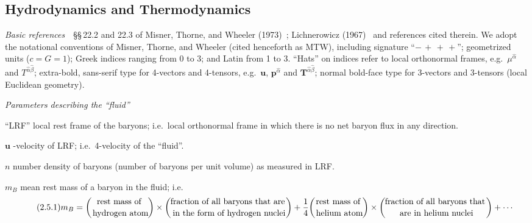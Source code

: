 

\subsection{Hydrodynamics and Thermodynamics}
\label{sec:2.5}

\emph{Basic references}~~\S\S\,22.2 and 22.3 of Misner, Thorne, and Wheeler
(1973)~\cite{MTW1973}; Lichnerowicz (1967)~\cite{Lichnerowicz1967} and
references cited therein.  We adopt the notational conventions of
Misner, Thorne, and Wheeler (cited henceforth as MTW), including
signature ``$-\,+\,+\,+$''; geometrized units ($c = G = 1$); Greek
indices ranging from 0 to 3; and Latin from 1 to 3.  ``Hats'' on indices
refer to local orthonormal frames, e.g.\ $\mu^{\hat{\alpha}}$ and
$T^{\hat{\alpha}\hat{\beta}}$; extra-bold, sans-serif type for 4-vectors
and 4-tensors, e.g.\ $\mathbf{u}$, $\mathbf{p}^{\hat{\alpha}}$ and
$\mathbf{T}^{\hat{\alpha}\hat{\beta}}$; normal bold-face type for
3-vectors and 3-tensors (local Euclidean geometry).

\bigskip
\noindent
\emph{Parameters describing the ``fluid''}

\smallskip
\noindent
``LRF'' \quad local rest frame of the baryons; i.e.\ local orthonormal
frame in which there is no net baryon flux in any direction.

\smallskip
\noindent
$\mathbf{u}$ -velocity of LRF; i.e.\ 4-velocity of the ``fluid''.

\smallskip
\noindent
$n$ \quad number density of baryons (number of baryons per unit volume)
as measured in LRF.

\smallskip
\noindent
$m_B$ \quad mean rest mass of a baryon in the fluid; i.e.
%
\begin{equation}
\tag{2.5.1}
m_B
= \left(\!\text{rest mass of}\atop\text{hydrogen atom}\!\right)
  \times \left(\!\text{fraction of all baryons that are}\atop
              \text{in the form of hydrogen nuclei}\!\right)
  + \frac{1}{4}\!\left(\!\text{rest mass of}\atop\text{helium atom}\!\right)
  \times \left(\!\text{fraction of all baryons that}\atop
              \text{are in helium nuclei}\!\right)
  + \cdots
\end{equation}

